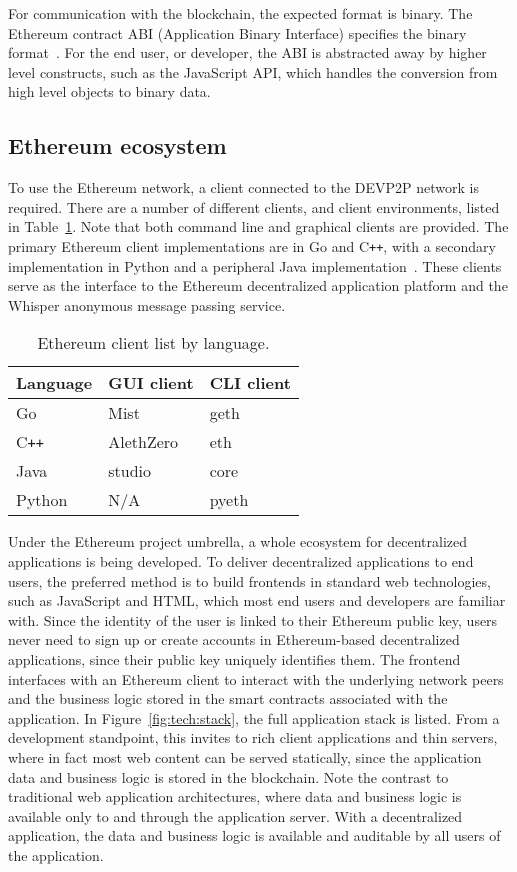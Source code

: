 For communication with the blockchain, the expected format is binary. The Ethereum contract ABI (Application Binary Interface) specifies the binary format~\cite{ethereum-contract-abi}. For the end user, or developer, the ABI is abstracted away by higher level constructs, such as the JavaScript API, which handles the conversion from high level objects to binary data.

\subsection{Ethereum ecosystem}
To use the Ethereum network, a client connected to the DEVP2P network is required. There are a number of different clients, and client environments, listed in Table~\ref{eth-clients}. Note that both command line and graphical clients are provided. The primary Ethereum client implementations are in Go and C\texttt{++}, with a secondary implementation in Python and a peripheral Java implementation~\cite{github-goeth}\cite{github-cppeth}\cite{github-javaeth}\cite{github-pyeth}. These clients serve as the interface to the Ethereum decentralized application platform and the Whisper anonymous message passing service.

\begin{table}[ht]
\centering
\caption{Ethereum client list by language.}
\label{eth-clients}
\begin{tabular}{|l|l|l|}
\hline \textbf{Language} & \textbf{GUI client} & \textbf{CLI client} \\ \hline
Go & Mist & geth \\ \hline
C\texttt{++} & AlethZero & eth \\ \hline
Java & studio & core \\ \hline
Python & N/A & pyeth \\ \hline
\end{tabular}
\end{table}

Under the Ethereum project umbrella, a whole ecosystem for decentralized applications is being developed. To deliver decentralized applications to end users, the preferred method is to build frontends in standard web technologies, such as JavaScript and HTML, which most end users and developers are familiar with. Since the identity of the user is linked to their Ethereum public key, users never need to sign up or create accounts in Ethereum-based decentralized applications, since their public key uniquely identifies them. The frontend interfaces with an Ethereum client to interact with the underlying network peers and the business logic stored in the smart contracts associated with the application. In Figure~\ref{fig:tech:stack}, the full application stack is listed.
From a development standpoint, this invites to rich client applications and thin servers, where in fact most web content can be served statically, since the application data and business logic is stored in the blockchain. Note the contrast to traditional web application architectures, where data and business logic is available only to and through the application server. With a decentralized application, the data and business logic is available and auditable by all users of the application.


